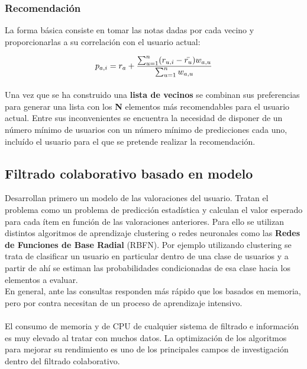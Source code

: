 \documentclass[12pt,letterpaper,oneside] {memoir}
\begin{document}
\subsubsection*{Recomendación}

La forma básica consiste en tomar las notas dadas por cada vecino y proporcionarlas a su correlación con el usuario actual:

\begin{equation}
\displaystyle p_{a,i} = r_a + { \sum_{u=1}^{n}(r_{u,i}-\bar{r_u}) w_{a,u} \over  \sum_{u=1}^{n} w_{a,u}}
\end{equation}

\paragraph{}
Una vez que se ha construido una \textbf{lista de vecinos} se combinan sus preferencias para generar una lista con los \textbf{N} elementos más recomendables para el usuario actual. Entre sus inconvenientes se encuentra la necesidad de disponer de un número mínimo de usuarios con un número mínimo de predicciones cada uno, incluído el usuario para el que se pretende realizar la recomendación.

\subsection{Filtrado colaborativo basado en modelo}

Desarrollan primero un modelo de las valoraciones del usuario. Tratan el problema como un problema de predicción estadística y calculan el valor esperado para cada ítem en función de las valoraciones anteriores. Para ello se utilizan distintos algoritmos de aprendizaje clustering o redes neuronales como las \textbf{Redes de Funciones de Base Radial} (RBFN).
Por ejemplo utilizando clustering se trata de clasificar un usuario en particular dentro de una clase de usuarios y a partir de ahí se estiman las probabilidades condicionadas de esa clase hacia los elementos a evaluar.\\
En general, ante las consultas responden más rápido que los basados en memoria, pero por contra necesitan de un proceso de aprendizaje intensivo. 
\paragraph{}
El consumo de memoria y de CPU de cualquier sistema de filtrado e información es muy elevado al tratar con muchos datos. La optimización de los algoritmos para mejorar su rendimiento es uno de los principales campos de investigación dentro del filtrado colaborativo.
\end{document}
